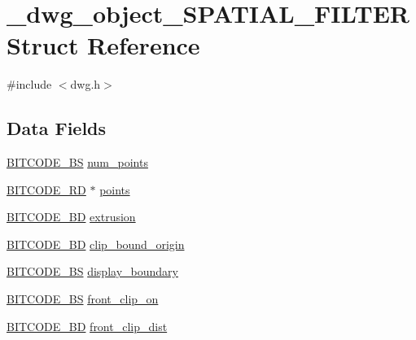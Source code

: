 \hypertarget{struct__dwg__object__SPATIAL__FILTER}{\section{\-\_\-dwg\-\_\-object\-\_\-\-S\-P\-A\-T\-I\-A\-L\-\_\-\-F\-I\-L\-T\-E\-R \-Struct \-Reference}
\label{struct__dwg__object__SPATIAL__FILTER}
}


{\ttfamily \#include $<$dwg.\-h$>$}

\subsection*{\-Data \-Fields}
\begin{DoxyCompactItemize}
\item 
\hyperlink{dwg_8h_a94297606fbd4a4ff97e8add284af0809}{\-B\-I\-T\-C\-O\-D\-E\-\_\-\-B\-S} \hyperlink{struct__dwg__object__SPATIAL__FILTER_ac9e1d164cb09425ae430d1ad736a0143}{num\-\_\-points}
\item 
\hyperlink{dwg_8h_a1d23a9bc9a02453876b244dc6706f6a6}{\-B\-I\-T\-C\-O\-D\-E\-\_\-R\-D} $\ast$ \hyperlink{struct__dwg__object__SPATIAL__FILTER_a8150518a34ce10d2537b7e1e6df397cf}{points}
\item 
\hyperlink{dwg_8h_a00698ef1bb072aa0a9360c6fc1c57587}{\-B\-I\-T\-C\-O\-D\-E\-\_\-B\-D} \hyperlink{struct__dwg__object__SPATIAL__FILTER_a787de48ea3da687ec2f5544958ce9233}{extrusion}
\item 
\hyperlink{dwg_8h_a00698ef1bb072aa0a9360c6fc1c57587}{\-B\-I\-T\-C\-O\-D\-E\-\_\-B\-D} \hyperlink{struct__dwg__object__SPATIAL__FILTER_a5d89cfa6a8515f200afb6ad17bfdb7bc}{clip\-\_\-bound\-\_\-origin}
\item 
\hyperlink{dwg_8h_a94297606fbd4a4ff97e8add284af0809}{\-B\-I\-T\-C\-O\-D\-E\-\_\-\-B\-S} \hyperlink{struct__dwg__object__SPATIAL__FILTER_a6805a4ef0e0aa4e81b6fda90dc0ae5a8}{display\-\_\-boundary}
\item 
\hyperlink{dwg_8h_a94297606fbd4a4ff97e8add284af0809}{\-B\-I\-T\-C\-O\-D\-E\-\_\-\-B\-S} \hyperlink{struct__dwg__object__SPATIAL__FILTER_adb0b36cb91f101727e8fa1a27c32869e}{front\-\_\-clip\-\_\-on}
\item 
\hyperlink{dwg_8h_a3c1e6781466b74ba07785d57da70ed97}{\-B\-I\-T\-C\-O\-D\-E\-\_\-\-B\-D} \hyperlink{struct__dwg__object__SPATIAL__FILTER_a88a3f396a283e233bc70884f997107d0}{front\-\_\-clip\-\_\-dist}
\item 

\end{DoxyCompactItemize}

